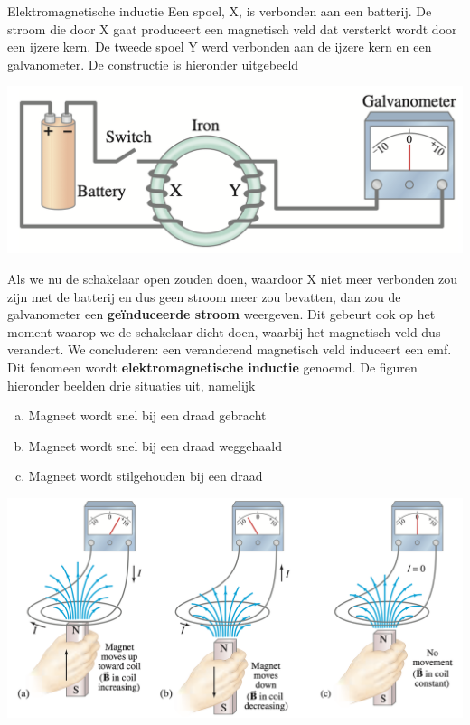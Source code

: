 \begin{theo}{Elektromagnetische inductie}
    Een spoel, X, is verbonden aan een batterij. De stroom die door X gaat produceert een magnetisch veld dat versterkt
    wordt door een ijzere kern. De tweede spoel Y werd verbonden aan de ijzere kern en een galvanometer. De constructie is hieronder uitgebeeld
    
    \begin{center}
        \includegraphics[scale = 0.35]{Images/Magnetisme/MagnetischeInductieExperiment.png}
    \end{center}

    \noindent Als we nu de schakelaar open zouden doen, waardoor X niet meer verbonden zou zijn met de batterij en dus geen stroom meer zou bevatten, 
    dan zou de galvanometer een \textbf{geïnduceerde stroom} weergeven. Dit gebeurt ook op het moment waarop we de schakelaar dicht doen, waarbij het
    magnetisch veld dus verandert. We concluderen: een veranderend magnetisch veld induceert een emf. Dit fenomeen wordt \textbf{elektromagnetische inductie} genoemd. 
    De figuren hieronder beelden drie situaties uit, namelijk
    \begin{enumerate}[(a)]
        \item Magneet wordt snel bij een draad gebracht
        \item Magneet wordt snel bij een draad weggehaald
        \item Magneet wordt stilgehouden bij een draad
    \end{enumerate}

    \begin{center}
        \includegraphics[scale = 0.35]{Images/Magnetisme/MagnetischeInductieMagneet.png}
    \end{center}
\end{theo}

